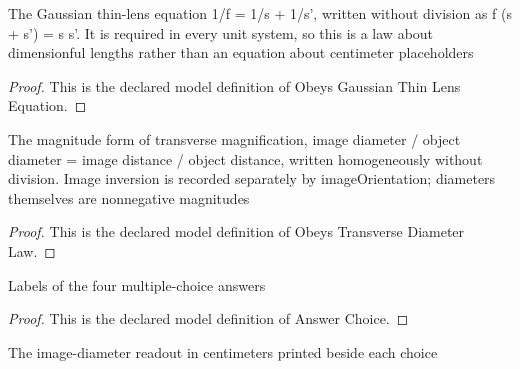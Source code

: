 \begin{definition}
  \label{def:physics:phyx-mini-0159:phyxminiproblems-problemphyxmini0159-obeysgaussianthinlensequation}
  The Gaussian thin-lens equation 1/f = 1/s + 1/s', written without division as f (s + s') = s s'. It is required in every unit system, so this is a law about dimensionful lengths rather than an equation about centimeter placeholders
\end{definition}
\begin{proof}
  This is the declared model definition of Obeys Gaussian Thin Lens Equation.
\end{proof}
\begin{definition}
  \label{def:physics:phyx-mini-0159:phyxminiproblems-problemphyxmini0159-obeystransversediameterlaw}
  The magnitude form of transverse magnification, image diameter / object diameter = image distance / object distance, written homogeneously without division. Image inversion is recorded separately by imageOrientation; diameters themselves are nonnegative magnitudes
\end{definition}
\begin{proof}
  This is the declared model definition of Obeys Transverse Diameter Law.
\end{proof}
\begin{definition}
  \label{def:physics:phyx-mini-0159:phyxminiproblems-problemphyxmini0159-answerchoice}
  Labels of the four multiple-choice answers
\end{definition}
\begin{proof}
  This is the declared model definition of Answer Choice.
\end{proof}
\begin{definition}
  \label{def:physics:phyx-mini-0159:phyxminiproblems-problemphyxmini0159-answerchoice-diameterincentimeters}
  The image-diameter readout in centimeters printed beside each choice
\end{definition}
